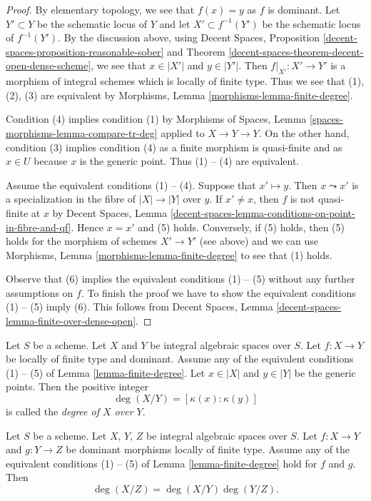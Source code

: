 \begin{proof}
By elementary topology, we see that $f(x) = y$ as $f$ is dominant.
Let $Y' \subset Y$ be the schematic locus of $Y$ and let
$X' \subset f^{-1}(Y')$ be the schematic locus of $f^{-1}(Y')$.
By the discussion above, using
Decent Spaces, Proposition \ref{decent-spaces-proposition-reasonable-sober} and
Theorem \ref{decent-spaces-theorem-decent-open-dense-scheme},
we see that $x \in |X'|$ and $y \in |Y'|$.
Then $f|_{X'} : X' \to Y'$ is a morphism of integral schemes
which is locally of finite type. Thus we see that (1), (2), (3)
are equivalent by Morphisms, Lemma \ref{morphisms-lemma-finite-degree}.

\medskip\noindent
Condition (4) implies condition (1) by
Morphisms of Spaces, Lemma \ref{spaces-morphisms-lemma-compare-tr-deg}
applied to $X \to Y \to Y$.
On the other hand, condition (3) implies condition (4) as
a finite morphism is quasi-finite and as $x \in U$ because $x$
is the generic point. Thus (1) -- (4) are equivalent.

\medskip\noindent
Assume the equivalent conditions (1) -- (4). Suppose that
$x' \mapsto y$. Then $x \leadsto x'$ is a specialization in the
fibre of $|X| \to |Y|$ over $y$. If $x' \not = x$, then $f$ is not
quasi-finite at $x$ by Decent Spaces, Lemma
\ref{decent-spaces-lemma-conditions-on-point-in-fibre-and-qf}.
Hence $x = x'$ and (5) holds. Conversely, if (5) holds, then
(5) holds for the morphism of schemes $X' \to Y'$ (see above)
and we can use
Morphisms, Lemma \ref{morphisms-lemma-finite-degree}
to see that (1) holds.

\medskip\noindent
Observe that (6) implies the equivalent conditions (1) -- (5)
without any further assumptions on $f$. To finish the proof
we have to show the equivalent conditions (1) -- (5) imply (6).
This follows from Decent Spaces, Lemma
\ref{decent-spaces-lemma-finite-over-dense-open}.
\end{proof}

\begin{definition}
\label{definition-degree}
Let $S$ be a scheme.
Let $X$ and $Y$ be integral algebraic spaces over $S$.
Let $f : X \to Y$ be locally of finite type and dominant.
Assume any of the equivalent conditions (1) -- (5) of
Lemma \ref{lemma-finite-degree}. Let $x \in |X|$ and $y \in |Y|$
be the generic points. Then the positive integer
$$
\deg(X/Y) = [\kappa(x) : \kappa(y)]
$$
is called the {\it degree of $X$ over $Y$}.
\end{definition}

\begin{lemma}
\label{lemma-degree-composition}
Let $S$ be a scheme.
Let $X$, $Y$, $Z$ be integral algebraic spaces over $S$.
Let $f : X \to Y$ and $g : Y \to Z$ be dominant morphisms locally
of finite type. Assume any of the equivalent conditions
(1) -- (5) of Lemma \ref{lemma-finite-degree} hold for $f$ and $g$. Then
$$
\deg(X/Z) = \deg(X/Y) \deg(Y/Z).
$$
\end{lemma}

